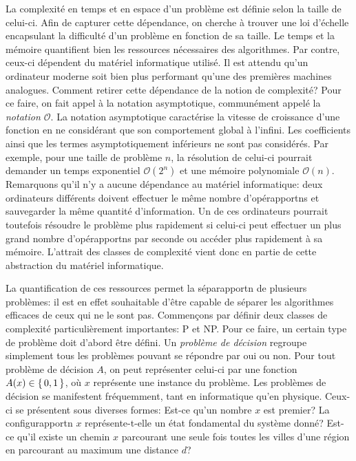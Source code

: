 La complexité en temps et en espace d'un problème est définie selon la taille de celui-ci. Afin de capturer cette dépendance, on cherche à trouver une loi d'échelle encapsulant la difficulté d'un problème en fonction de sa taille. Le temps et la mémoire quantifient bien les ressources nécessaires des algorithmes. Par contre, ceux-ci dépendent du matériel informatique utilisé. Il est attendu qu'un ordinateur moderne soit bien plus performant qu'une des premières machines analogues. Comment retirer cette dépendance de la notion de complexité? Pour ce faire, on fait appel à la notation asymptotique, communément appelé la \textit{notation $\mathcal{O}$}. La notation asymptotique caractérise la vitesse de croissance d'une fonction en ne considérant que son comportement global à l'infini. Les coefficients ainsi que les termes asymptotiquement inférieurs ne sont pas considérés. Par exemple, pour une taille de problème $n$, la résolution de celui-ci pourrait demander un temps exponentiel $\mathcal{O}(2^{n})$ et une mémoire polynomiale $\mathcal{O}(n)$. Remarquons qu'il n'y a aucune dépendance au matériel informatique: deux ordinateurs différents doivent effectuer le même nombre d'opérapportns et sauvegarder la même quantité d'information. Un de ces ordinateurs pourrait toutefois résoudre le problème plus rapidement si celui-ci peut effectuer un plus grand nombre d'opérapportns par seconde ou accéder plus rapidement à sa mémoire. L'attrait des classes de complexité vient donc en partie de cette abstraction du matériel informatique.

La quantification de ces ressources permet la séparapportn de plusieurs problèmes: il est en effet souhaitable d'être capable de séparer les algorithmes efficaces de ceux qui ne le sont pas. Commençons par définir deux classes de complexité particulièrement importantes: \textsf{P} et \textsf{NP}. Pour ce faire, un certain type de problème doit d'abord être défini. Un \textit{problème de décision} regroupe simplement tous les problèmes pouvant se répondre par oui ou non. Pour tout problème de décision $A$, on peut représenter celui-ci par une fonction $A(x) \in \set{ 0, 1 }$, où $x$ représente une instance du problème. Les problèmes de décision se manifestent fréquemment, tant en informatique qu'en physique. Ceux-ci se présentent sous diverses formes: Est-ce qu'un nombre $x$ est premier? La configurapportn $x$ représente-t-elle un état fondamental du système donné? Est-ce qu'il existe un chemin $x$ parcourant une seule fois toutes les villes d'une région en parcourant au maximum une distance $d$?

